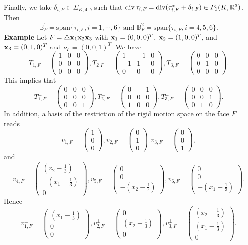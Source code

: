\documentclass{amsart}
\def\p#1{\begin{pmatrix}#1\end{pmatrix}} \def\c{\operatorname{curl}}
\numberwithin{table}{section}
\numberwithin{figure}{section}
\begin{document}
Finally, we take $\delta_{i, F}\in \Sigma_{K, 4,b}$ such that $\operatorname{div} \tau_{i, F}=\operatorname{div} (\tau_{i,F}^\ast+\delta_{i,F})\in P_1(K, \mathbb{R}^3)$. Then
\begin{equation}
\mathbb{B}_F^1=\text{span}\{\tau_{i, F}, i=1, \cdots, 6\}\text{ and }\mathbb{B}_F^2=\text{span}\{\tau_{i, F}, i=4, 5, 6\}.
\end{equation}
{\bf Example} Let $F=\triangle \mathbf{x}_1\mathbf{x}_2\mathbf{x}_3$ with $\mathbf{x}_1=(0,0,0)^T$, $\mathbf{x}_2=(1,0,0)^T$, and $\mathbf{x}_3=(0,1,0)^T$
 and $\nu_F=(0,0,1)^T$.  We have
 \begin{equation}
 T_{1,F}=\p{1&0&0\\ 0&0&0\\0&0&0 }, T_{2,F}=\p{1&-1&0\\ -1&1&0\\0&0&0 }, T_{3,F}=\p{0&0&0\\ 0&1&0\\0&0&0 }.
 \end{equation}
 This implies that
 \begin{equation}
 T_{1,F}^\perp=\p{0&0&0\\ 0&0&0\\0&0&1 }, T_{2,F}^\perp=\p{0&&1\\ 0&0&0\\1&0&0 }, T_{3,F}^\perp=\p{0&0&0\\ 0&0&1\\0&1&0 }.
 \end{equation}
 In addition,  a basis of the restriction
 of the rigid motion space on the face $F$ reads
 \begin{equation}
 v_{1,F}=\p{1\\0 \\0}, v_{2,F}=\p{0\\1 \\0}, v_{3,F}=\p{0\\0 \\1},
 \end{equation}
and
\begin{equation}
 v_{4,F}=\p{(x_2-\frac{1}{3})\\-(x_1-\frac{1}{3}) \\0}, v_{5,F}=\p{0\\0 \\-(x_2-\frac{1}{3})},
 v_{6,F}=\p{0\\0 \\-(x_1-\frac{1}{3})}.
 \end{equation}
Hence
\begin{equation}
 v_{1,F}^\perp=\p{(x_1-\frac{1}{3})\\0 \\0}, v_{2,F}^\perp=\p{0\\(x_2-\frac{1}{3})\\0 },
 v_{3,F}^\perp=\p{(x_2-\frac{1}{3})\\(x_1-\frac{1}{3}) \\0}.
 \end{equation}
\end{document}
